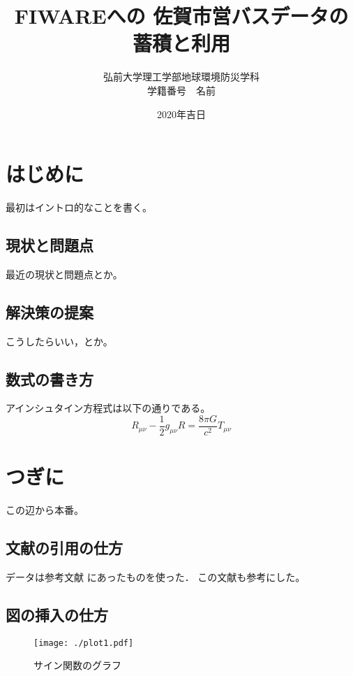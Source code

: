 \documentclass[a4paper, 12pt]{jsreport}
\title{FIWAREへの
佐賀市営バスデータの蓄積と利用
}
\author{弘前大学理工学部地球環境防災学科\\
学籍番号　名前}
\date{2020年吉日}
\begin{document}
  \maketitle
  \tableofcontents

  \chapter{はじめに}


  最初はイントロ的なことを書く。
  \section{現状と問題点}


  最近の現状と問題点とか。

  \section{解決策の提案}


  こうしたらいい，とか。

  \section{数式の書き方}


  アインシュタイン方程式は以下の通りである。
  \begin{equation}
    R_{\mu\nu}- \frac{1}{2}g_{\mu\nu}R = \frac{8\pi G}{c^{2}}T_{\mu\nu}
  \end{equation}

  \chapter{つぎに}


  この辺から本番。

  \section{文献の引用の仕方}


  データは参考文献\cite{rika} にあったものを使った． この文献\cite{ten}も参考にした。

  \section{図の挿入の仕方}
  \begin{figure}[h]
    \begin{center}
      \texttt{[image: ./plot1.pdf]}
      \caption{サイン関数のグラフ}
    \end{center}
  \end{figure}
\end{document}
